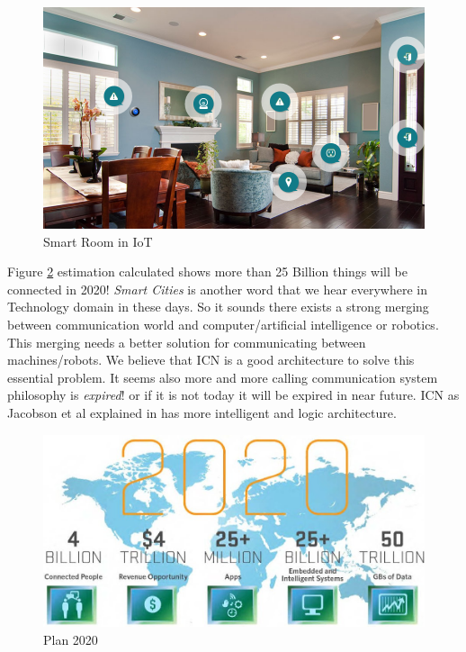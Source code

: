 \begin{figure}[H]

\begin{center}

\includegraphics[scale = 0.35]{Pictures/internetofthings.png}

\caption{Smart Room in IoT} \label{internetofthings} 

\end{center}

\end{figure}

Figure \ref{2020} estimation calculated shows more than 25 Billion things will be connected in 2020! \textit{Smart Cities} is another word that we hear everywhere in Technology domain in these days. So it sounds there exists a strong merging between communication world and computer/artificial intelligence or robotics. This merging needs a better solution for communicating between machines/robots. We believe that ICN is a good architecture to solve this essential problem. It seems also more and more calling communication system philosophy is \textit{expired}! or if it is not today it will be expired in near future. ICN as Jacobson et al explained in \cite{jacobson} has more intelligent and logic architecture.


\begin{figure}[H]

\begin{center}

\includegraphics[scale = 0.31]{Pictures/2020.jpg}

\caption{Plan 2020} \label{2020} 

\end{center}

\end{figure}


